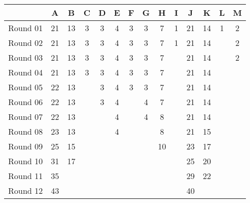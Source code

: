 \documentclass[11pt]{article}
\begin{document}
\begin{tabular}{ | l | c | c | c | c |  c |  c |  c |  c |  c |  c |  c |  c |  c |  }
\hline
& A & B & C & D & E & F & G & H & I & J & K & L & M \\ \hline
\hline
Round 01 & 21 & 13 & 3 & 3 & 4 & 3 & 3 &  7 & 1 & 21 & 14 & 1 & 2 \\ \hline
Round 02 & 21 & 13 & 3 & 3 & 4 & 3 & 3 &  7 & 1 & 21 & 14 &   & 2 \\ \hline
Round 03 & 21 & 13 & 3 & 3 & 4 & 3 & 3 &  7 &   & 21 & 14 &   & 2 \\ \hline
Round 04 & 21 & 13 & 3 & 3 & 4 & 3 & 3 &  7 &   & 21 & 14 &   &   \\ \hline
Round 05 & 22 & 13 &   & 3 & 4 & 3 & 3 &  7 &   & 21 & 14 &   &   \\ \hline
Round 06 & 22 & 13 &   & 3 & 4 &   & 4 &  7 &   & 21 & 14 &   &   \\ \hline
Round 07 & 22 & 13 &   &   & 4 &   & 4 &  8 &   & 21 & 14 &   &   \\ \hline
Round 08 & 23 & 13 &   &   & 4 &   &   &  8 &   & 21 & 15 &   &   \\ \hline
Round 09 & 25 & 15 &   &   &   &   &   & 10 &   & 23 & 17 &   &   \\ \hline
Round 10 & 31 & 17 &   &   &   &   &   &    &   & 25 & 20 &   &   \\ \hline
Round 11 & 35 &    &   &   &   &   &   &    &   & 29 & 22 &   &   \\ \hline
Round 12 & 43 &    &   &   &   &   &   &    &   & 40 &    &   &   \\ \hline
\end{tabular}
\end{document}
